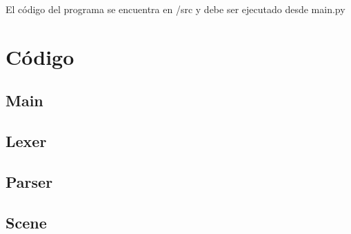 \documentclass[a4paper, 10pt, twoside]{article}
\begin{document}
El código del programa se encuentra en /src y debe ser ejecutado desde main.py

\section{Código}

\subsection{Main}

\begin{small}

\end{small}


\subsection{Lexer}

\begin{small}

\end{small}

\subsection{Parser}

\begin{small}

\end{small}

\subsection{Scene}

\begin{small}

\end{small}
\end{document}
